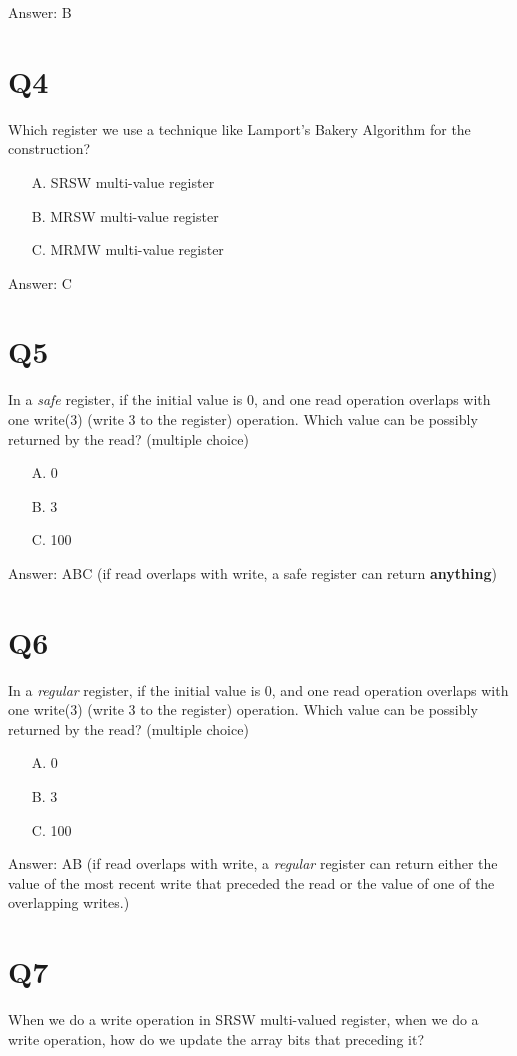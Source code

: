 \documentclass[twoside]{article}
\begin{document}
Answer: B


\section*{Q4}
Which register we use a technique like Lamport's Bakery Algorithm for the construction?
\begin{enumerate}
\item[A.] SRSW  multi-value register
\item[B.] MRSW multi-value register
\item[C.] MRMW multi-value register
\end{enumerate}


Answer: C


\section*{Q5}
In a \textit{safe} register, if the initial value is 0, and one read operation overlaps with one write(3) (write 3 to the register) operation. Which value can be possibly returned by the read? (multiple choice)

\begin{enumerate}
\item[A.] 0
\item[B.] 3
\item[C.] 100
\end{enumerate}

Answer: ABC  (if read overlaps with write, a safe register can return \textbf{anything})


\section*{Q6}
In a \textit{regular} register, if the initial value is 0, and one read operation overlaps with one write(3) (write 3 to the register) operation. Which value can be possibly returned by the read? (multiple choice)

\begin{enumerate}
\item[A.] 0
\item[B.] 3
\item[C.] 100
\end{enumerate}

Answer: AB (if read overlaps with write, a \textit{regular} register can return either the value of the most recent write that preceded the read or the value of one of the overlapping writes.)

\section*{Q7}
When we do a write operation in SRSW multi-valued register, when we do a write operation, how do we update the array bits that preceding it?
\end{document}
